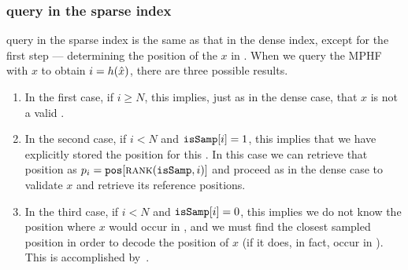   \subsubsection*{\kmer query in the sparse \pufferfish index}  \kmer query in the sparse \pufferfish index
  is the same as that in the dense index, except for the first step ---
  determining the position of the \kmer $x$ in \cseq. When we query the MPHF with
  $x$ to obtain $i = h(\hat{x})$, there are three possible results.
  \begin{enumerate}
    \item In the first case, if $i \geq N$, this implies, just as in the dense case, that $x$ is
    not a valid \kmer.
    \item In the second case, if $i < N$ and $\texttt{isSamp}[i] = 1$, this
    implies that we have explicitly stored the position for this \kmer. In this
    case we can retrieve that position as $p_{i} = \texttt{pos}[\mbox{\sc rank}(\texttt{isSamp}, i)]$ and
    proceed as in the dense case to validate $x$ and retrieve its reference positions.
    \item In the third case, if $i < N$ and $\texttt{isSamp}[i] = 0$, this implies we do not know
    the position where $x$ would occur in \cseq, and we must find the closest sampled position in order
    to decode the position of $x$ (if it does, in fact, occur in \cseq).
    This is accomplished by~.
  \end{enumerate}

